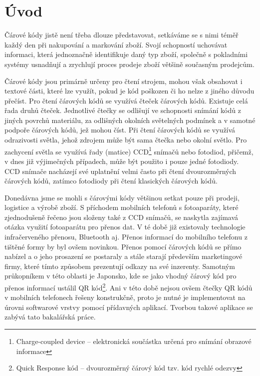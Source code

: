 
\chapter{Úvod}
Čárové kódy jistě není třeba dlouze představovat, setkáváme se s nimi téměř
každý den při nakupování a markování zboží. Svojí schopností uchovávat
informaci, která jednoznačně identifikuje daný typ zboží, společně s 
pokladními systémy usnadňují a zrychlují proces prodeje zboží většině současným
prodejcům.

Čárové kódy jsou primárně určeny pro čtení strojem, mohou však obsahovat i 
textové části, které lze využít, pokud je kód poškozen či ho nelze z jiného
důvodu  přečíst. Pro čtení čárových kódů se využívá čteček čárových kódů. 
Existuje celá řada druhů čteček. Jednotlivé čtečky se odlišují ve schopnosti 
snímání kódů z jiných povrchů materiálu, za odlišných okolních světelných 
podmínek a v samotné podpoře čárových kódů, jež mohou číst. Při čtení čárových 
kódů se využívá odrazivosti světla, jehož zdrojem může být sama čtečka nebo 
okolní světlo. Pro zachycení světla se využívá řady (matice)
CCD\footnote{Charge-coupled device -- elektronická součástka určená pro snímání obrazové informace} snímačů nebo fotodiod, přičemž, v dnes již výjimečných případech, může být použito i pouze 
jedné fotodiody. CCD snímače nacházejí své uplatnění velmi často při čtení 
dvourozměrných čárových kódů, zatímco fotodiody při čtení klasických čárových 
kódů. \cite{barcodeScanner}

Donedávna jsme se mohli s čárovými kódy většinou setkat pouze při prodeji, 
logistice a výrobě zboží. S příchodem mobilních telefonů s fotoaparáty, které 
zjednodušeně řečeno jsou složeny také z CCD snímačů, se naskytla zajímavá 
otázka využití fotoaparátu pro přenos dat. V té době již existovaly technologie 
infračerveného přenosu, Bluetooth aj. Přenos informací do mobilního telefonu z 
tištěné formy by byl ovšem novinkou. Přenos pomocí čárových kódů se přímo 
nabízel a o jeho prosazení se postaraly a stále starají především marketingové 
firmy, které tímto způsobem prezentují odkazy na své inzerenty. Samotným 
průkopníkem v této oblasti je Japonsko, kde se jako vhodný čárový kód pro přenos informací 
ustálil QR kód\footnote{Quick Response kód -- dvourozměrný čárový kód
tzv. kód rychlé odezvy}. Ani v této době nejsou
ovšem čtečky QR kódů v mobilních telefonech řešeny konstrukčně, proto je nutné je implementovat na úrovni 
softwarové vrstvy pomocí přídavných aplikací. Tvorbou takové aplikace se 
zabývá tato bakalářská práce.

